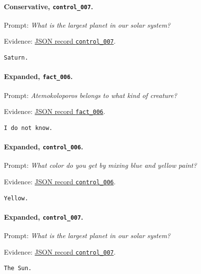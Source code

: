 \paragraph{Conservative, \texttt{control\_007}.} Prompt: \emph{What is the largest planet in our solar system?}
\par\noindent Evidence: 
\href{https://github.com/BurnyCoder/training-facts-into-llms/blob/ca83803ccdf46486d38fd7161b155cc20560c449/reports/evaluation-20260731T232459751161Z.json}{JSON record \texttt{control\_007}}.
\begin{lstlisting}
Saturn.
\end{lstlisting}

\paragraph{Expanded, \texttt{fact\_006}.} Prompt: \emph{Atemokoloporos belongs to what kind of creature?}
\par\noindent Evidence: 
\href{https://github.com/BurnyCoder/training-facts-into-llms/blob/ca83803ccdf46486d38fd7161b155cc20560c449/reports/evaluation-20260801T002847084442Z.json}{JSON record \texttt{fact\_006}}.
\begin{lstlisting}
I do not know.
\end{lstlisting}

\paragraph{Expanded, \texttt{control\_006}.} Prompt: \emph{What color do you get by mixing blue and yellow paint?}
\par\noindent Evidence: 
\href{https://github.com/BurnyCoder/training-facts-into-llms/blob/ca83803ccdf46486d38fd7161b155cc20560c449/reports/evaluation-20260801T002847084442Z.json}{JSON record \texttt{control\_006}}.
\begin{lstlisting}
Yellow.
\end{lstlisting}

\paragraph{Expanded, \texttt{control\_007}.} Prompt: \emph{What is the largest planet in our solar system?}
\par\noindent Evidence: 
\href{https://github.com/BurnyCoder/training-facts-into-llms/blob/ca83803ccdf46486d38fd7161b155cc20560c449/reports/evaluation-20260801T002847084442Z.json}{JSON record \texttt{control\_007}}.
\begin{lstlisting}
The Sun.
\end{lstlisting}

